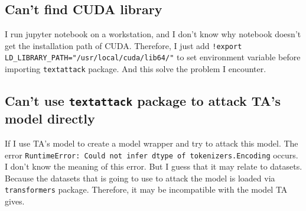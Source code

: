 \documentclass{article}[12pt]
\begin{document}
\subsection{Can't find CUDA library}
I run jupyter notebook on a workstation, and I don't know why notebook doesn't get the installation path of CUDA. Therefore, I just add \texttt{!export LD\_LIBRARY\_PATH="/usr/local/cuda/lib64/"} to set environment variable before importing \texttt{textattack} package. And this solve the problem I encounter.

\subsection{Can't use \texttt{textattack} package to attack TA's model directly}

If I use TA's model to create a model wrapper and try to attack this model. The error \texttt{RuntimeError: Could not infer dtype of tokenizers.Encoding} occurs. I don't know the meaning of this error. But I guess that it may relate to datasets. Because the datasets that is going to use to attack the model is loaded via \texttt{transformers} package. Therefore, it may be incompatible with the model TA gives.
\end{document}
